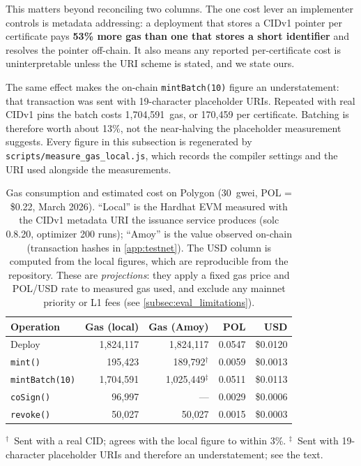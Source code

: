 This matters beyond reconciling two columns. The one cost lever an implementer
controls is metadata addressing: a deployment that stores a CIDv1 pointer per
certificate pays \textbf{53\% more gas than one that stores a short
identifier} and resolves the pointer off-chain. It also means any reported
per-certificate cost is uninterpretable unless the URI scheme is stated, and we
state ours.

The same effect makes the on-chain \texttt{mintBatch(10)} figure an understatement:
that transaction was sent with 19-character placeholder URIs. Repeated with real
CIDv1 pins the batch costs 1{,}704{,}591~gas, or 170{,}459 per certificate. Batching
is therefore worth about 13\%, not the near-halving the placeholder measurement
suggests. Every figure in this subsection is regenerated by
\texttt{scripts/measure\_gas\_local.js}, which records the compiler settings and
the URI used alongside the measurements.

\begin{table}[ht]
\centering
\caption{Gas consumption and estimated cost on Polygon (30~gwei, POL = \$0.22,
March 2026). ``Local'' is the Hardhat EVM measured with the CIDv1 metadata URI the
issuance service produces (solc 0.8.20, optimizer 200 runs); ``Amoy'' is the value
observed on-chain (transaction hashes in \cref{app:testnet}). The USD column is
computed from the local figures, which are reproducible from the repository. These
are \emph{projections}: they apply a fixed gas price and POL/USD rate to measured
gas used, and exclude any mainnet priority or L1 fees
(see \cref{subsec:eval_limitations}).}
\label{tab:gas}
\footnotesize
\setlength{\tabcolsep}{3pt}
\begin{tabular}{@{}lrrrr@{}}
\toprule
\textbf{Operation} & \textbf{Gas (local)} & \textbf{Gas (Amoy)} & \textbf{POL} & \textbf{USD} \\
\midrule
Deploy                 & 1{,}824{,}117 & 1{,}824{,}117 & 0.0547 & \$0.0120 \\
\texttt{mint()}        &   195{,}423 & 189{,}792$^{\dagger}$ & 0.0059 & \$0.0013 \\
\texttt{mintBatch(10)} & 1{,}704{,}591 & 1{,}025{,}449$^{\ddagger}$ & 0.0511 & \$0.0113 \\
\texttt{coSign()}      &    96{,}997 & --- & 0.0029 & \$0.0006 \\
\texttt{revoke()}      &    50{,}027 &  50{,}027 & 0.0015 & \$0.0003 \\
\bottomrule
\end{tabular}

\vspace{2pt}
\raggedright\scriptsize
$^{\dagger}$~Sent with a real CID; agrees with the local figure to within 3\%.
$^{\ddagger}$~Sent with 19-character placeholder URIs and therefore an
understatement; see the text.
\end{table}

